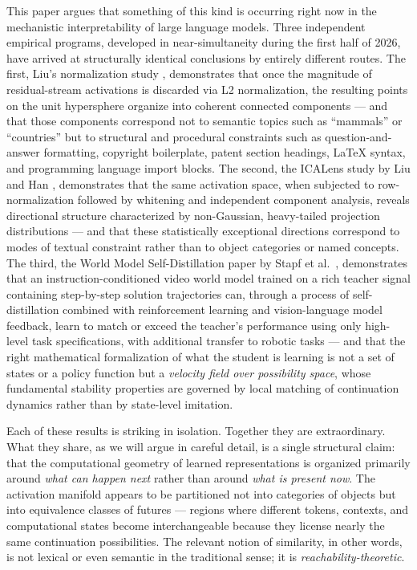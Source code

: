 \documentclass[12pt, a4paper]{article}
\theoremstyle{plain}
\theoremstyle{definition}
\theoremstyle{remark}
\begin{document}
This paper argues that something of this kind is occurring right now in the
mechanistic interpretability of large language models. Three independent
empirical programs, developed in near-simultaneity during the first half of
2026, have arrived at structurally identical conclusions by entirely different
routes. The first, Liu's normalization study \cite{liu2026normgeometry},
demonstrates that once the magnitude of residual-stream activations is
discarded via L2 normalization, the resulting points on the unit hypersphere
organize into coherent connected components --- and that those components
correspond not to semantic topics such as ``mammals'' or ``countries'' but to
structural and procedural constraints such as question-and-answer formatting,
copyright boilerplate, patent section headings, LaTeX syntax, and programming
language import blocks. The second, the ICALens study by Liu and Han
\cite{liu2026icalens}, demonstrates that the same activation space, when
subjected to row-normalization followed by whitening and independent component
analysis, reveals directional structure characterized by non-Gaussian,
heavy-tailed projection distributions --- and that these statistically
exceptional directions correspond to modes of textual constraint rather than
to object categories or named concepts. The third, the World Model
Self-Distillation paper by Stapf et al.\ \cite{stapf2026wmsd}, demonstrates
that an instruction-conditioned video world model trained on a rich teacher
signal containing step-by-step solution trajectories can, through a process
of self-distillation combined with reinforcement learning and vision-language
model feedback, learn to match or exceed the teacher's performance using only
high-level task specifications, with additional transfer to robotic tasks --- and that the right mathematical formalization of what the
student is learning is not a set of states or a policy function but a
\emph{velocity field over possibility space}, whose fundamental stability
properties are governed by local matching of continuation dynamics rather than
by state-level imitation.

Each of these results is striking in isolation. Together they are
extraordinary. What they share, as we will argue in careful detail, is a
single structural claim: that the computational geometry of learned
representations is organized primarily around \emph{what can happen next}
rather than around \emph{what is present now}. The activation manifold appears
to be partitioned not into categories of objects but into equivalence classes
of futures --- regions where different tokens, contexts, and computational
states become interchangeable because they license nearly the same
continuation possibilities. The relevant notion of similarity, in other
words, is not lexical or even semantic in the traditional sense; it is
\emph{reachability-theoretic}.
\end{document}
